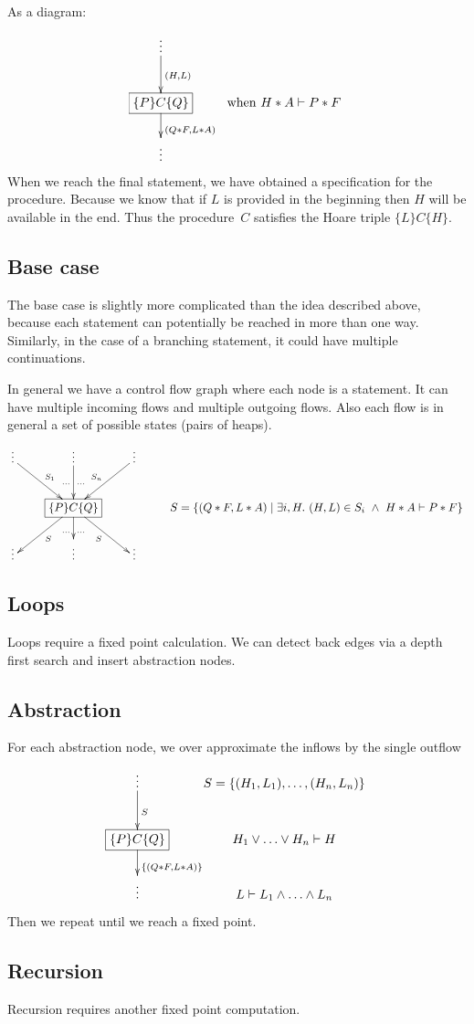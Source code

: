 \documentclass{article}
\newcommand{\hoare}[3]{\{#1\}#2\{#3\}}
\newcommand{\set}[2]{\{#1 \mid #2\}}
\newcommand{\ts}{\vdash} %
\begin{document}
As a diagram:
\[
\xymatrix{
{\vdots} \ar[d]^{(H, L)} \\
*+[F]{\hoare P C Q} \ar[d]^{(Q * F, L * A)} &
{\mathrm{when}\ H * A \ts P * F} \\
{\vdots}
}
\]
When we reach the final statement, we have obtained a specification
for the procedure. Because we know that if $L$ is provided in the
beginning then $H$ will be available in the end. Thus the procedure~$C$
satisfies the Hoare triple $\hoare L C H$.

\subsection{Base case}\label{sec:symbexe:base}
The base case is slightly more complicated than the idea described
above, because each statement can potentially be reached in more than
one way. Similarly, in the case of a branching statement, it could
have multiple continuations.

In general we have a control flow graph where each node is a
statement. It can have multiple incoming flows and multiple outgoing
flows. Also each flow is in general a set of possible states (pairs of
heaps).
\[
\xymatrix{
{\vdots} \ar[dr]^{S_1} & {\vdots} \ar[d]_{\ldots}^{\ldots} & {\vdots} \ar[dl]_{S_n} \\
& *+[F]{\hoare P C Q} \ar[dl]^{S} \ar[d]_{\ldots}^{\ldots} \ar[dr]_{S}
& & S = \set{(Q * F, L * A)}{\exists i, H.\ (H, L)\in S_i\ \land\ H * A \ts P * F} \\
{\vdots} & {\vdots} & {\vdots}
}
\]

\subsection{Loops}\label{sec:symbexe:loops}
Loops require a fixed point calculation. We can detect back edges via
a depth first search and insert abstraction nodes.

\subsection{Abstraction}\label{sec:symbexe:abstraction}
For each abstraction node, we over approximate the inflows by the single outflow
\[
\xymatrix{
{\vdots} \ar[d]^{S} & {S = \{(H_1, L_1), \ldots, (H_n, L_n)\}}\\
*+[F]{\hoare P C Q} \ar[d]^{\{(Q * F, L * A)\}} & H_1 \lor \ldots \lor H_n \ts H \\
{\vdots} & L \ts L_1 \land \ldots \land L_n
}
\]
Then we repeat until we reach a fixed point.
\subsection{Recursion}\label{sec:symbexe:recursion}
Recursion requires another fixed point computation.
\end{document}
